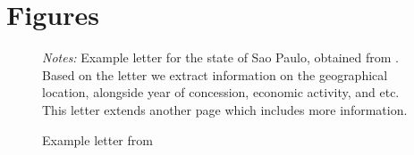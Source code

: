 \documentclass{article}
\begin{document}
\clearpage



\clearpage

%

\clearpage



\clearpage



\clearpage



\clearpage

\appendix

\setcounter{figure}{0}  
\setcounter{table}{0}  

\renewcommand{\thefigure}{A.\arabic{figure}}
\renewcommand{\thetable}{A.\arabic{table}}

\section{Figures}

\begin{figure}[h!]
  \begin{center}
  \caption{Example letter from \textcite{noauthor_1921-qd}}
  \label{fig:example_letter_sp}
  \vspace{3mm}
  \end{center}
  \textit{Notes:} Example letter for the state of Sao Paulo, obtained from \textcite[p.~47]{noauthor_1921-qd}. Based on the letter we extract information on the geographical location, alongside year of concession, economic activity, and etc. This letter extends another page which includes more information.
\end{figure}
\end{document}
